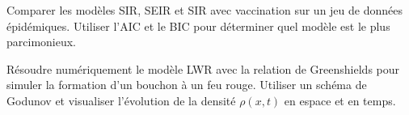\begin{exercice}
Comparer les mod\`eles SIR, SEIR et SIR avec vaccination sur un jeu
de donn\'ees \'epid\'emiques. Utiliser l'AIC et le BIC pour d\'eterminer
quel mod\`ele est le plus parcimonieux.
\end{exercice}

\begin{exercice}
R\'esoudre num\'eriquement le mod\`ele LWR avec la relation de
Greenshields pour simuler la formation d'un bouchon \`a un feu rouge.
Utiliser un sch\'ema de Godunov et
visualiser l'\'evolution de la densit\'e $\rho(x,t)$ en espace et en temps.
\end{exercice}
